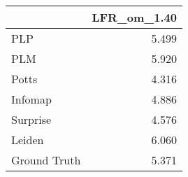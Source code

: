 \begin{tabular}{lr}
\toprule
{} & LFR_om_1.40 \\
\midrule
PLP          &       5.499 \\
PLM          &       5.920 \\
Potts        &       4.316 \\
Infomap      &       4.886 \\
Surprise     &       4.576 \\
Leiden       &       6.060 \\
Ground Truth &       5.371 \\
\bottomrule
\end{tabular}
